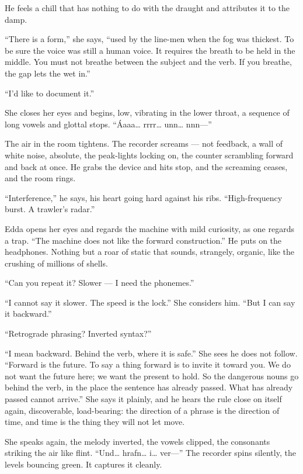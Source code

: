 \documentclass[11pt,oneside]{book}
\newcommand{\sceneline}{%
  \par\vspace{1.2em}
  \begin{center}
    \fontsize{11}{11}\selectfont \textbullet\quad\textbullet\quad\textbullet
  \end{center}
  \vspace{0.6em}\noindent\ignorespaces
}
\begin{document}
He feels a chill that has nothing to do with the draught and attributes
it to the damp.

\sceneline

``There is a form,'' she says, ``used by the line-men when the fog was
thickest. To be sure the voice was still a human voice. It requires the
breath to be held in the middle. You must not breathe between the
subject and the verb. If you breathe, the gap lets the wet in.''

``I'd like to document it.''

She closes her eyes and begins, low, vibrating in the lower throat, a
sequence of long vowels and glottal stops. ``Áaaa\ldots{} rrrr\ldots{}
unn\ldots{} nnn---''

The air in the room tightens. The recorder screams --- not feedback, a
wall of white noise, absolute, the peak-lights locking on, the counter
scrambling forward and back at once. He grabs the device and hits stop,
and the screaming ceases, and the room rings.

``Interference,'' he says, his heart going hard against his ribs.
``High-frequency burst. A trawler's radar.''

Edda opens her eyes and regards the machine with mild curiosity, as one
regards a trap. ``The machine does not like the forward construction.''
He puts on the headphones. Nothing but a roar of static that sounds,
strangely, organic, like the crushing of millions of shells.

``Can you repeat it? Slower --- I need the phonemes.''

``I cannot say it slower. The speed is the lock.'' She considers him.
``But I can say it backward.''

``Retrograde phrasing? Inverted syntax?''

``I mean backward. Behind the verb, where it is safe.'' She sees he does
not follow. ``Forward is the future. To say a thing forward is to invite
it toward you. We do not want the future here; we want the present to
hold. So the dangerous nouns go behind the verb, in the place the
sentence has already passed. What has already passed cannot arrive.''
She says it plainly, and he hears the rule close on itself again,
discoverable, load-bearing: the direction of a phrase is the direction
of time, and time is the thing they will not let move.

She speaks again, the melody inverted, the vowels clipped, the
consonants striking the air like flint. ``Und\ldots{} hrafn\ldots{}
i\ldots{} ver---'' The recorder spins silently, the levels bouncing
green. It captures it cleanly.
\end{document}
